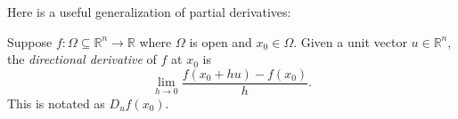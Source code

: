 \documentclass[11pt]{article}
\theoremstyle{definition}
\newcommand{\R}{\mathbb{R}}                      %
\begin{document}
Here is a useful generalization of partial derivatives:
\begin{mdframed}[backgroundcolor = blue!10]
\vspace{+0.2cm}
 Suppose $f:\Omega\subseteq \R^n\to \R$ where $\Omega$ is open and $x_0\in \Omega$. Given a unit vector $u\in\R^n$, the \textit{directional derivative} of $f$ at $x_0$ is 
$$
\lim_{h\to0} \frac{f(x_0+hu)-f(x_0)}{h}.
$$
This is notated as $D_uf(x_0)$.
\end{mdframed}
\end{document}
